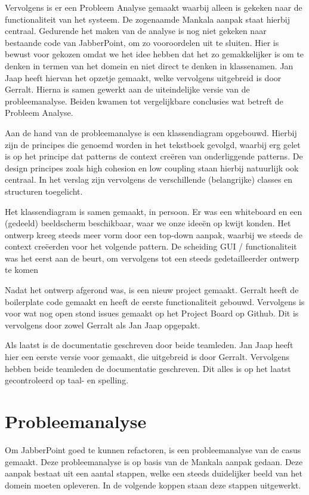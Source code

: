 \documentclass[a4paper]{article}
\newcommand{\1}[0]{\'{e}\'{e}n}
\begin{document}
Vervolgens is er een Probleem Analyse gemaakt waarbij alleen is gekeken naar de functionaliteit van het systeem. De zogenaamde Mankala aanpak staat hierbij centraal. Gedurende het maken van de analyse is nog niet gekeken naar bestaande code van JabberPoint, om zo vooroordelen uit te sluiten. Hier is bewust voor gekozen omdat we het idee hebben dat het zo gemakkelijker is om te denken in termen van het domein en niet direct te denken in klassenamen. Jan Jaap heeft hiervan het opzetje gemaakt, welke vervolgens uitgebreid is door Gerralt. Hierna is samen gewerkt aan de uiteindelijke versie van de probleemanalyse. Beiden kwamen tot vergelijkbare conclusies wat betreft de Probleem Analyse.

Aan de hand van de probleemanalyse is een klassendiagram opgebouwd. Hierbij zijn de principes die genoemd worden in het tekstboek gevolgd, waarbij erg gelet is op het principe dat patterns de context creëren van onderliggende patterns. De design principes zoals high cohesion en low coupling staan hierbij natuurlijk ook centraal. In het verslag zijn vervolgens de verschillende (belangrijke) classes en structuren toegelicht.

Het klassendiagram is samen gemaakt, in persoon. Er was een whiteboard en een (gedeeld) beeldscherm beschikbaar, waar we onze idee\"{e}n op kwijt konden. Het ontwerp kreeg steeds meer vorm door een top-down aanpak, waarbij we steeds de context cre\"{e}erden voor het volgende pattern. De scheiding GUI / functionaliteit was het eerst aan de beurt, om vervolgens tot een steeds gedetailleerder ontwerp te komen

Nadat het ontwerp afgerond was, is een nieuw project gemaakt. Gerralt heeft de boilerplate code gemaakt en heeft de eerste functionaliteit gebouwd. Vervolgens is voor wat nog open stond issues gemaakt op het Project Board op Github. Dit is vervolgens door zowel Gerralt als Jan Jaap opgepakt.

Als laatst is de documentatie geschreven door beide teamleden. Jan Jaap heeft hier een eerste versie voor gemaakt, die uitgebreid is door Gerralt. Vervolgens hebben beide teamleden de documentatie geschreven. Dit alles is op het laatst gecontroleerd op taal- en spelling.

\section{Probleemanalyse}
Om JabberPoint goed te kunnen refactoren, is een probleemanalyse van de casus gemaakt. Deze probleemanalyse is op basis van de Mankala aanpak gedaan. Deze aanpak bestaat uit een aantal stappen, welke een steeds duidelijker beeld van het domein moeten opleveren. In de volgende koppen staan deze stappen uitgewerkt.
\end{document}
